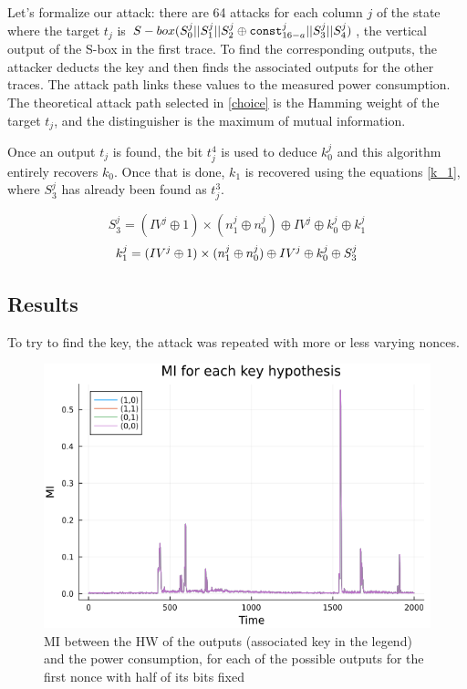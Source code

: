 \documentclass[11pt,technote]{IEEEtran}
\begin{document}
	Let's formalize our attack: there are 64 attacks for each column $j$ of the state where the target $t_j$ is $S-box(S_0^j||S_1^j||S_2^j \oplus \verb|const|_{16-a}^j||S_3^j||S_4^j)$, the vertical output of the S-box in the first trace. To find the corresponding outputs, the attacker deducts the key and then finds the associated outputs for the other traces. The attack path links these values to the measured power consumption. The theoretical attack path selected in \ref{choice} is the Hamming weight of the target $t_j$, and the distinguisher is the maximum of mutual information.
	
	Once an output $t_j$ is found, the bit $t_j^4$ is used to deduce $k_0^j$ and this algorithm entirely recovers $k_0$. Once that is done, $k_1$ is recovered using the equations \ref{k_1}, where $S_3^j$ has already been found as $t_j^3$.
	
	\begin{equation} 
		S_3^j = (IV^j \oplus 1) \times (n_1^j \oplus n_0^j) \oplus IV^j \oplus k_0^j \oplus k_1^j
	\end{equation}
	\begin{equation} \label{k_1}
		k_1^j = (IV^j \oplus 1) \times (n_1^j \oplus n_0^j) \oplus IV^j \oplus k_0^j \oplus S_3^j\\
	\end{equation}
	
	\subsection{Results}
	To try to find the key, the attack was repeated with more or less varying nonces.
	
	\begin{figure}[h]
		\centering
		\includegraphics[scale=0.4]{img_files/nonces_half_fixed}
		\caption{MI between the HW of the outputs (associated key in the legend) and the power consumption, for each of the possible outputs for the first nonce with half of its bits fixed}
		\label{half_fixed}
	\end{figure}
	
\end{document}
